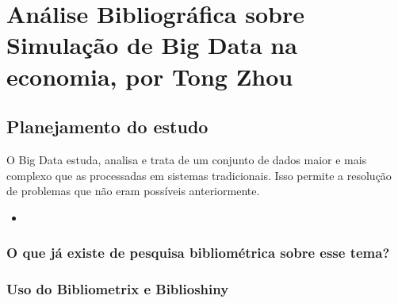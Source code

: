 \chapter{Análise Bibliográfica sobre Simulação de Big Data na economia, por Tong Zhou\label{chap:bibliometria:Tong00020}}


\section{Planejamento do estudo}

O Big Data estuda, analisa e trata de um conjunto de dados maior e mais complexo que as processadas em sistemas tradicionais. Isso permite a resolução de problemas que não eram possíveis anteriormente.



\begin{itemize}
    \item 
\end{itemize}


\subsection{O que já existe de pesquisa bibliométrica sobre esse tema?}


\subsection{Uso do Bibliometrix e Biblioshiny}

